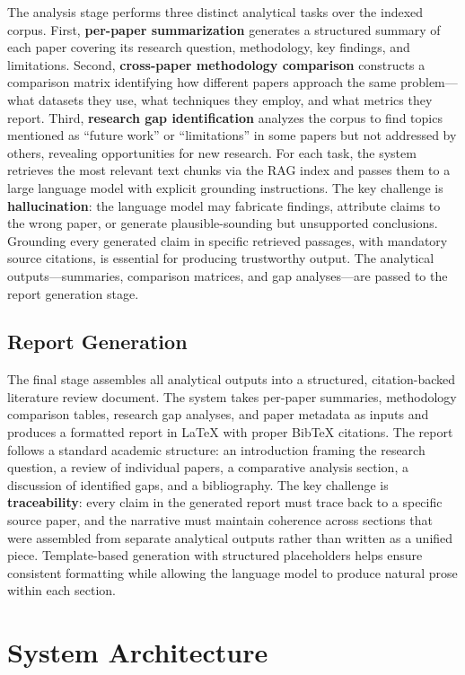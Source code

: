 \documentclass[12pt,a4paper]{article}
\begin{document}
The analysis stage performs three distinct analytical tasks over the indexed corpus. First, \textbf{per-paper summarization} generates a structured summary of each paper covering its research question, methodology, key findings, and limitations. Second, \textbf{cross-paper methodology comparison} constructs a comparison matrix identifying how different papers approach the same problem---what datasets they use, what techniques they employ, and what metrics they report. Third, \textbf{research gap identification} analyzes the corpus to find topics mentioned as ``future work'' or ``limitations'' in some papers but not addressed by others, revealing opportunities for new research. For each task, the system retrieves the most relevant text chunks via the RAG index and passes them to a large language model with explicit grounding instructions. The key challenge is \textbf{hallucination}: the language model may fabricate findings, attribute claims to the wrong paper, or generate plausible-sounding but unsupported conclusions. Grounding every generated claim in specific retrieved passages, with mandatory source citations, is essential for producing trustworthy output. The analytical outputs---summaries, comparison matrices, and gap analyses---are passed to the report generation stage.

\subsection{Report Generation}

The final stage assembles all analytical outputs into a structured, citation-backed literature review document. The system takes per-paper summaries, methodology comparison tables, research gap analyses, and paper metadata as inputs and produces a formatted report in LaTeX with proper BibTeX citations. The report follows a standard academic structure: an introduction framing the research question, a review of individual papers, a comparative analysis section, a discussion of identified gaps, and a bibliography. The key challenge is \textbf{traceability}: every claim in the generated report must trace back to a specific source paper, and the narrative must maintain coherence across sections that were assembled from separate analytical outputs rather than written as a unified piece. Template-based generation with structured placeholders helps ensure consistent formatting while allowing the language model to produce natural prose within each section.

\section{System Architecture}
\end{document}
